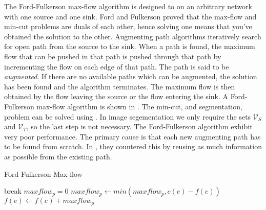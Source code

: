 The Ford-Fulkerson max-flow algorithm \citep{Ford1956} is designed to on an arbitrary network with one source and one sink. Ford and Fulkerson proved that the max-flow and min-cut problems are duals of each other, hence solving one means that you've obtained the solution to the other. Augmenting path algorithms iteratively search for open path from the source to the sink. When a path is found, the maximum flow that can be pushed in that path is pushed through that path by incrementing the flow on each edge of that path. The path is said to be \textit{augmented}. If there are no available paths which can be augmented, the solution has been found and the algorithm terminates. The maximum flow is then obtained by the flow leaving the source or the flow entering the sink. A Ford-Fulkerson max-flow algorithm is shown in . The min-cut, and segmentation, problem can be solved using . In image segementation we only require the sets $\mathcal{V}_S$ and $\mathcal{V}_T$, so the last step is not necessary. The Ford-Fulkerson algorithm exhibit very poor performance. The primary cause is that each new augmenting path has to be found from scratch. In \citep{Boykvo2001_3}, they countered this by reusing as much information as possible from the existing path.

\begin{algorithm}[!t]
	\caption{Ford-Fulkerson Max-flow}\label{alg:fordfulkerson}
	\begin{algorithmic}[1]
					\State break
				\EndIf
				\newline
				\State $maxflow_p = 0$
					\State $maxflow_p \gets min(maxflow_p,c(e)-f(e))$
				\EndFor
				\newline
					\State $f(e) \gets f(e) + maxflow_p$
				\EndFor
			\EndWhile\label{fordfulkersonwhile}
		\EndProcedure
	\end{algorithmic}
\end{algorithm}

